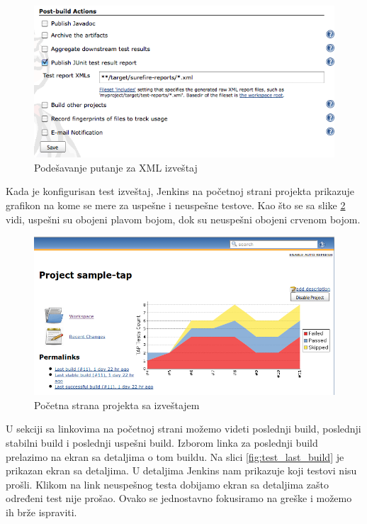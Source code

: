\begin{figure}[h!]
\begin{center}
\includegraphics[scale=0.5]{slike/test_xml_path.png}
\end{center}
\caption{Podešavanje putanje za XML izveštaj}
\label{fig:test_xml_path}
\end{figure}

Kada je konfigurisan test izveštaj, Jenkins na početnoj strani projekta prikazuje grafikon na kome se mere za uspešne i neuspešne testove. Kao što se sa slike  \ref{fig:test_project_home} vidi, uspešni su obojeni plavom bojom, dok su neuspešni obojeni crvenom bojom. 

\begin{figure}
\begin{center}
\includegraphics[scale=0.45]{slike/test_project_home.png}
\end{center}
\caption{Početna strana projekta sa izveštajem}
\label{fig:test_project_home}
\end{figure}

U sekciji sa linkovima na početnoj strani možemo videti poslednji build, poslednji stabilni build i poslednji uspešni build. Izborom linka za poslednji build prelazimo na ekran sa detaljima o tom buildu. Na slici \ref{fig:test_last_build} je prikazan ekran sa detaljima. U detaljima Jenkins nam prikazuje koji testovi nisu prošli. Klikom na link neuspešnog testa dobijamo ekran sa detaljima zašto određeni test nije prošao. Ovako se jednostavno fokusiramo na greške i možemo ih brže ispraviti.

